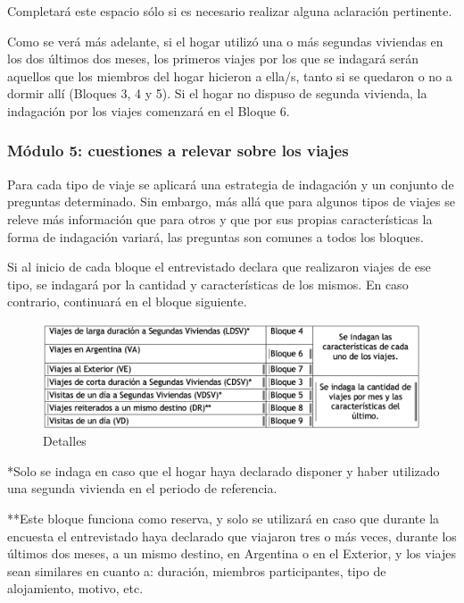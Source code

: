 \documentclass[
  openany]{book}
\begin{document}
Completará este espacio sólo si es necesario realizar alguna aclaración pertinente.

Como se verá más adelante, si el hogar utilizó una o más segundas viviendas en los dos últimos dos meses, los primeros viajes por los que se indagará serán aquellos que los miembros del hogar hicieron a ella/s, tanto si se quedaron o no a dormir allí (Bloques 3, 4 y 5). Si el hogar no dispuso de segunda vivienda, la indagación por los viajes comenzará en el Bloque 6.

\hypertarget{muxf3dulo-5-cuestiones-a-relevar-sobre-los-viajes}{%
\subsubsection{Módulo 5: cuestiones a relevar sobre los viajes}\label{muxf3dulo-5-cuestiones-a-relevar-sobre-los-viajes}}

Para cada tipo de viaje se aplicará una estrategia de indagación y un conjunto de preguntas determinado. Sin embargo, más allá que para algunos tipos de viajes se releve más información que para otros y que por sus propias características la forma de indagación variará, las preguntas son comunes a todos los bloques.

Si al inicio de cada bloque el entrevistado declara que realizaron viajes de ese tipo, se indagará por la cantidad y características de los mismos. En caso contrario, continuará en el bloque siguiente.

\begin{figure}

{\centering \includegraphics[width=1\linewidth]{imagenes/figura6-71} 

}

\caption{Detalles}\label{fig:detalle}
\end{figure}

*Solo se indaga en caso que el hogar haya declarado disponer y haber utilizado una segunda vivienda en el periodo de referencia.

**Este bloque funciona como reserva, y solo se utilizará en caso que durante la encuesta el entrevistado haya declarado que viajaron tres o más veces, durante los últimos dos meses, a un mismo destino, en Argentina o en el Exterior, y los viajes sean similares en cuanto a: duración, miembros participantes, tipo de alojamiento, motivo, etc.
\end{document}
